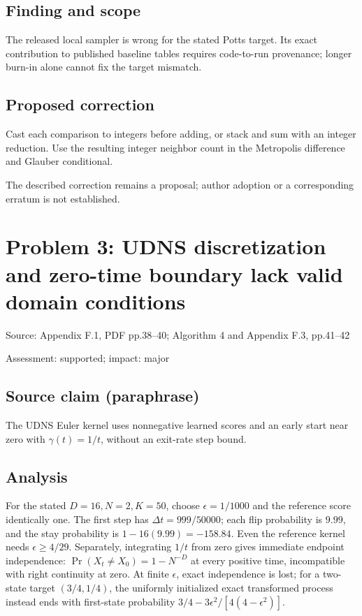 \documentclass[11pt]{article}
\begin{document}
\subsection*{Finding and scope}

The released local sampler is wrong for the stated Potts target. Its exact contribution to published baseline tables requires code-to-run provenance; longer burn-in alone cannot fix the target mismatch.

\subsection*{Proposed correction}

Cast each comparison to integers before adding, or stack and sum with an integer reduction. Use the resulting integer neighbor count in the Metropolis difference and Glauber conditional.

The described correction remains a proposal; author adoption or a corresponding erratum is not established.

\section*{Problem 3: UDNS discretization and zero-time boundary lack valid domain conditions}

Source: Appendix F.1, PDF pp.38–40; Algorithm 4 and Appendix F.3, pp.41–42

Assessment: supported; impact: major

\subsection*{Source claim (paraphrase)}

The UDNS Euler kernel uses nonnegative learned scores and an early start near zero with \(\gamma(t)=1/t\), without an exit-rate step bound.

\subsection*{Analysis}

For the stated \(D=16,N=2,K=50\), choose \(\epsilon=1/1000\) and the reference score identically one. The first step has \(\Delta t=999/50000\); each flip probability is \(9.99\), and the stay probability is \(1-16(9.99)=-158.84\). Even the reference kernel needs \(\epsilon\geq4/29\). Separately, integrating \(1/t\) from zero gives immediate endpoint independence: \(\Pr(X_t\ne X_0)=1-N^{-D}\) at every positive time, incompatible with right continuity at zero. At finite \(\epsilon\), exact independence is lost; for a two-state target \((3/4,1/4)\), the uniformly initialized exact transformed process instead ends with first-state probability \(3/4-3\epsilon^2/[4(4-\epsilon^2)]\).
\end{document}

